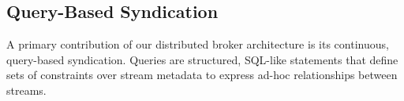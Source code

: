%
%
\subsection{Query-Based Syndication}

A primary contribution of our distributed broker architecture is its continuous, query-based syndication.
Queries are structured, SQL-like statements that define sets of constraints over stream metadata to express ad-hoc relationships between streams.
